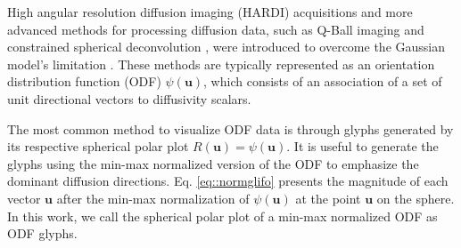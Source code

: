 \documentclass[twoside,twocolumn,10pt]{article}
\begin{document}
High angular resolution diffusion imaging (HARDI) acquisitions and more advanced methods for processing diffusion data, such as Q-Ball imaging \cite{TuchQBall2004} and constrained spherical deconvolution \cite{tournier2007}, were introduced to overcome the Gaussian model's limitation \cite{descoteaux2015}. These methods are typically represented as an orientation distribution function (ODF) $\psi(\bm{u})$, which consists of an association of a set of unit directional vectors to diffusivity scalars. %



The most common method to visualize ODF data is through glyphs generated by its respective spherical polar plot $R(\bm{u})=\psi (\bm{u})$. It is useful to generate the glyphs using the min-max normalized version of the ODF \cite{TuchQBall2004} to emphasize the dominant diffusion directions. Eq. \ref{eq::normglifo} presents the magnitude of each vector $\bm{u}$ after the min-max normalization of $\psi(\bm{u})$ at the point $\bm{u}$ on the sphere. In this work, we call the spherical polar plot of a min-max normalized ODF as ODF glyphs.
\end{document}
